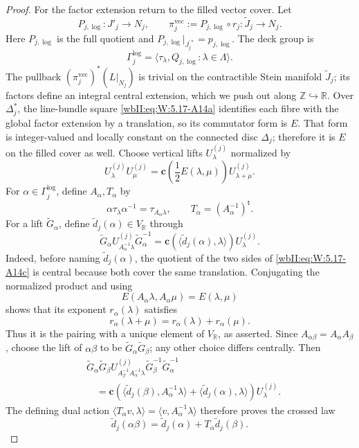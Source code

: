 \begin{proof}
For the factor extension return to the filled vector cover.  Let
\[
 P_{j,\log}:J'_j\longrightarrow N_j,\qquad
 \pi_j^{\mathrm{vec}}:=P_{j,\log}\circ r_j:
 \widetilde J_j\longrightarrow N_j .
\]
Here \(P_{j,\log}\) is the full quotient and
\(P_{j,\log}|_{J_j^{\prime *}}=p_{j,\log}\).
The deck group is
\[
 \Gamma_j^{\log}
 =\langle\tau_\lambda,Q_{j,\log}:\lambda\in\Lambda\rangle.
\]
The pullback \((\pi_j^{\mathrm{vec}})^*(L|_{N_j})\) is trivial on the
contractible Stein manifold \(\widetilde J_j\); its factors define an
integral central extension, which we push out along
\(\mathbb Z\hookrightarrow\mathbb R\).  Over \(\Delta_j^*\), the
line-bundle square \eqref{wbII:eq:W:5.17-A14a} identifies each fibre with the global factor
extension by a translation, so its commutator form is \(E\).  That form is
integer-valued and locally constant on the connected disc \(\Delta_j\);
therefore it is \(E\) on the filled cover as well.  Choose vertical lifts
\(U_\lambda^{(j)}\) normalized by
\[
 U_\lambda^{(j)}U_\mu^{(j)}
 =\mathbf c\!\left(\frac12E(\lambda,\mu)\right)
  U_{\lambda+\mu}^{(j)}.
\]
For \(\alpha\in\Gamma_j^{\log}\), define \(A_\alpha,T_\alpha\) by
\[
 \alpha\tau_\lambda\alpha^{-1}=\tau_{A_\alpha\lambda},\qquad
 T_\alpha=(A_\alpha^{-1})^{\mathsf t}.
\]
For a lift \(\widetilde G_\alpha\), define
\(\widetilde d_j(\alpha)\in V_{\mathbb R}\) through
\[
 \widetilde G_\alpha U_{A_\alpha^{-1}\lambda}^{(j)}
 \widetilde G_\alpha^{-1}
 =\mathbf c\!\left(\langle\widetilde d_j(\alpha),\lambda\rangle\right)
  U_\lambda^{(j)}.
\tag{W.108}\label{wbII:eq:W:5.17-A14c}
\]
Indeed, before naming \(\widetilde d_j(\alpha)\), the quotient of the two
sides of \eqref{wbII:eq:W:5.17-A14c} is central because both cover the same translation.
Conjugating the normalized product and using
\[
 E(A_\alpha\lambda,A_\alpha\mu)=E(\lambda,\mu)
\]
shows that its exponent \(r_\alpha(\lambda)\) satisfies
\[
 r_\alpha(\lambda+\mu)=r_\alpha(\lambda)+r_\alpha(\mu).
\]
Thus it is the pairing with a unique element of \(V_{\mathbb R}\), as
asserted.  Since \(A_{\alpha\beta}=A_\alpha A_\beta\), choose the lift of
\(\alpha\beta\) to be \(\widetilde G_\alpha\widetilde G_\beta\); any other
choice differs centrally.  Then
\[
\begin{aligned}
 &\widetilde G_\alpha\widetilde G_\beta
 U_{A_\beta^{-1}A_\alpha^{-1}\lambda}^{(j)}
 \widetilde G_\beta^{-1}\widetilde G_\alpha^{-1}\\
 &\quad=
 \mathbf c\!\left(
  \langle\widetilde d_j(\beta),A_\alpha^{-1}\lambda\rangle
  +\langle\widetilde d_j(\alpha),\lambda\rangle\right)
 U_\lambda^{(j)}.
\end{aligned}
\]
The defining dual action
\(\langle T_\alpha v,\lambda\rangle
=\langle v,A_\alpha^{-1}\lambda\rangle\) therefore proves the crossed law
\[
 \widetilde d_j(\alpha\beta)
 =\widetilde d_j(\alpha)+T_\alpha\widetilde d_j(\beta).
\tag{W.109}\label{wbII:eq:W:5.17-A14d}
\]


\end{proof}
